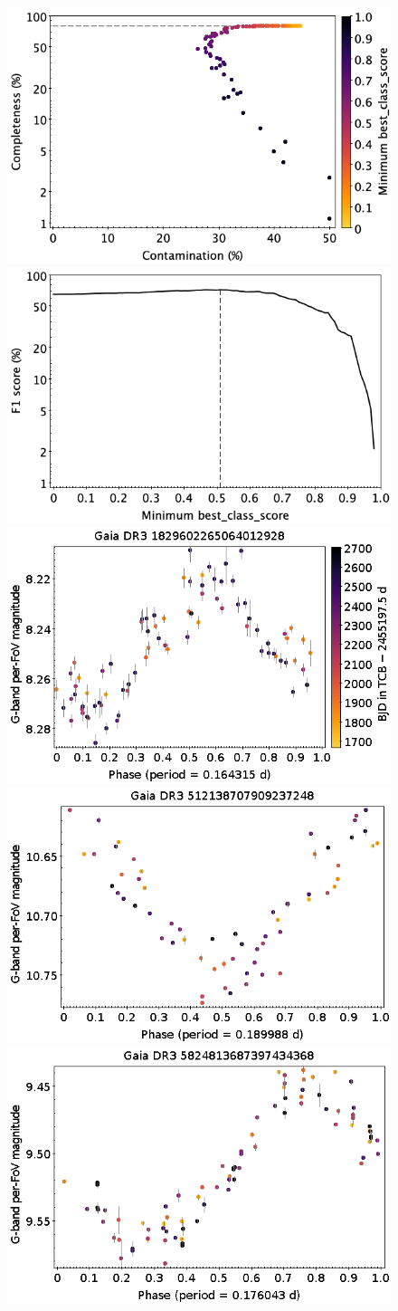 \documentclass[longauth]{aa}
\begin{document}
\begin{appendix}
\begin{figure}
\centering
{} \includegraphics[width=0.45\hsize]{figures/appendix/BCEP_cls_scc.png}  
\hspace{2mm}
 \includegraphics[width=0.45\hsize]{figures/appendix/BCEP_cls_sf1.png} \\ 
\vspace{4mm}
 \includegraphics[width=0.45\hsize]{figures/appendix/BCEP-1.png}  
\hspace{2mm}
 \includegraphics[width=0.45\hsize]{figures/appendix/BCEP-30.png} \\
\vspace{4mm}
 \includegraphics[width=0.45\hsize]{figures/appendix/BCEP-55.png}  

\end{figure}
\end{appendix}
\end{document}
